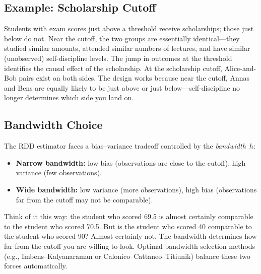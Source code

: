 \documentclass[11pt,a4paper]{article}
\theoremstyle{definition}
\theoremstyle{plain}
\theoremstyle{remark}
\begin{document}
\subsection{Example: Scholarship Cutoff}

Students with exam scores just above a threshold receive scholarships; those just below do not.
Near the cutoff, the two groups are essentially identical---they studied similar amounts, attended similar numbers of lectures, and have similar (unobserved) self-discipline levels.
The jump in outcomes at the threshold identifies the causal effect of the scholarship.
At the scholarship cutoff, Alice-and-Bob pairs exist on both sides. The design works because near the cutoff, Annas and Bens are equally likely to be just above or just below---self-discipline no longer determines which side you land on.

\subsection{Bandwidth Choice}

The RDD estimator faces a bias--variance tradeoff controlled by the \emph{bandwidth}~$h$:
\begin{itemize}[nosep]
  \item \textbf{Narrow bandwidth:} low bias (observations are close to the cutoff), high variance (few observations).
  \item \textbf{Wide bandwidth:} low variance (more observations), high bias (observations far from the cutoff may not be comparable).
\end{itemize}

Think of it this way: the student who scored 69.5 is almost certainly comparable to the student who scored 70.5. But is the student who scored 40 comparable to the student who scored 90? Almost certainly not. The bandwidth determines how far from the cutoff you are willing to look. Optimal bandwidth selection methods (e.g., Imbens--Kalyanaraman or Calonico--Cattaneo--Titiunik) balance these two forces automatically.
\end{document}

